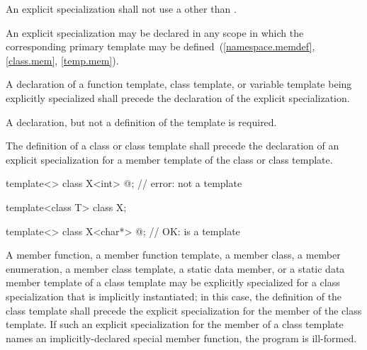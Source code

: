 \pnum
An explicit specialization shall not use
a 
other than .

\pnum
An explicit specialization
may be declared in any scope in which the corresponding primary template
may be defined~(\ref{namespace.memdef}, \ref{class.mem}, \ref{temp.mem}).

\pnum
A declaration of a function template, class template, or variable template being explicitly
specialized shall precede the declaration of
the explicit
specialization.
\begin{note}
A declaration, but not a definition of the template is required.
\end{note}
The definition of a class or class template shall precede the
declaration of an explicit specialization for a member template of the class
or class template.
\begin{example}

\begin{codeblock}
template<> class X<int> { @\commentellip@ };          // error:  not a template

template<class T> class X;

template<> class X<char*> { @\commentellip@ };        // OK:  is a template
\end{codeblock}
\end{example}

\pnum
A member function, a member function template, a member class,
a member enumeration, a
member class template,
a static data member, or a static data member template of a class template
may be explicitly specialized for a class specialization that is implicitly
instantiated;
in this case, the definition of the class template shall
precede the explicit specialization for the member of the class
template.
If such an explicit specialization for the member of a class template names an
implicitly-declared special member function,
the program is ill-formed.

